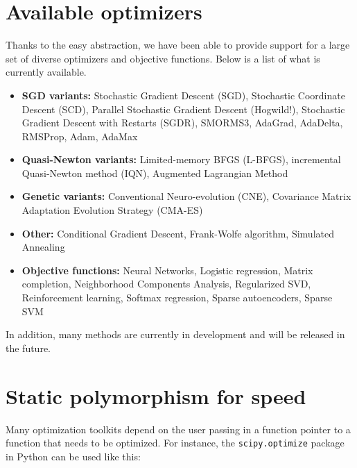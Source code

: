 \documentclass{article}
\begin{document}

\section{Available optimizers}

Thanks to the easy abstraction, we have been able to provide support for a large
set of diverse optimizers and objective functions.  Below is a list of what is
currently available.

\begin{itemize}
  \item {\bf SGD variants:} Stochastic Gradient Descent (SGD), Stochastic
      Coordinate Descent (SCD), Parallel Stochastic Gradient Descent (Hogwild!),
      Stochastic Gradient Descent with Restarts (SGDR), SMORMS3, AdaGrad,
      AdaDelta, RMSProp, Adam, AdaMax

  \item {\bf Quasi-Newton variants:} Limited-memory BFGS (L-BFGS), incremental
        Quasi-Newton method (IQN), Augmented Lagrangian Method

  \item {\bf Genetic variants:} Conventional Neuro-evolution (CNE), Covariance
        Matrix Adaptation Evolution Strategy (CMA-ES)

  \item {\bf Other:} Conditional Gradient Descent, Frank-Wolfe algorithm, Simulated Annealing

  \item {\bf Objective functions:} Neural Networks, Logistic regression,
      Matrix completion, Neighborhood Components Analysis, Regularized SVD,
      Reinforcement learning, Softmax regression, Sparse autoencoders,
      Sparse SVM
\end{itemize}

In addition, many methods are currently in development and will be released in
the future.  %

\section{Static polymorphism for speed}


Many optimization toolkits depend on the user passing in a function pointer to a
function that needs to be optimized.  For instance, the {\tt scipy.optimize}
package in Python can be used like this:
\end{document}
